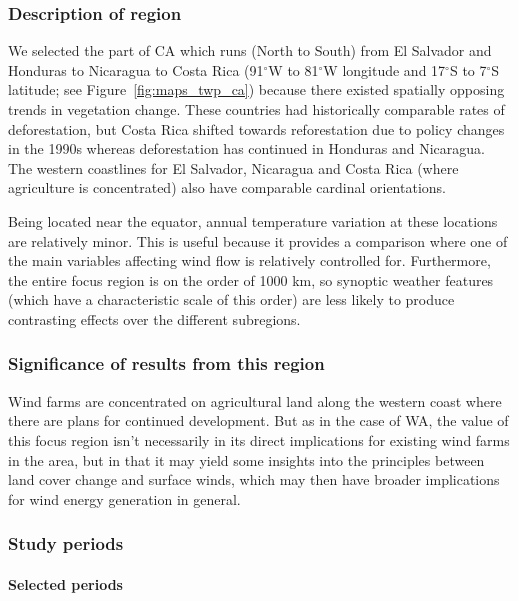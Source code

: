 \subsubsection{Description of region}

We selected the part of \ac{CA} which runs (North to South) from El Salvador and Honduras to Nicaragua to Costa Rica (91$^\circ$W to 81$^\circ$W longitude and 17$^\circ$S to 7$^\circ$S latitude; see Figure~\ref{fig:maps_twp_ca}) because there existed spatially opposing trends in vegetation change. These countries had historically comparable rates of deforestation, but Costa Rica shifted towards reforestation due to policy changes in the 1990s whereas deforestation has continued in Honduras and Nicaragua. The western coastlines for El Salvador, Nicaragua and Costa Rica (where agriculture is concentrated) also have comparable cardinal orientations.

Being located near the equator, annual temperature variation at these locations are relatively minor. This is useful because it provides a comparison where one of the main variables affecting wind flow is relatively controlled for. Furthermore, the entire focus region is on the order of 1000 km, so synoptic weather features (which have a characteristic scale of this order) are less likely to produce contrasting effects over the different subregions.

\subsubsection{Significance of results from this region}

Wind farms are concentrated on agricultural land along the western coast where there are plans for continued development. But as in the case of \ac{WA}, the value of this focus region isn't necessarily in its direct implications for existing wind farms in the area, but in that it may yield some insights into the principles between land cover change and surface winds, which may then have broader implications for wind energy generation in general.

\subsubsection{Study periods}
\label{sssec:period_seas_ca}

\paragraph{Selected periods}

